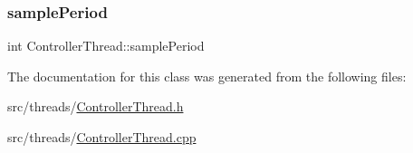 \subsubsection{\texorpdfstring{sample\+Period}{samplePeriod}}
{\footnotesize\ttfamily int Controller\+Thread\+::sample\+Period\hspace{0.3cm}{\ttfamily [private]}}



The documentation for this class was generated from the following files\+:\begin{DoxyCompactItemize}
\item 
src/threads/\hyperlink{ControllerThread_8h}{Controller\+Thread.\+h}\item 
src/threads/\hyperlink{ControllerThread_8cpp}{Controller\+Thread.\+cpp}\end{DoxyCompactItemize}
